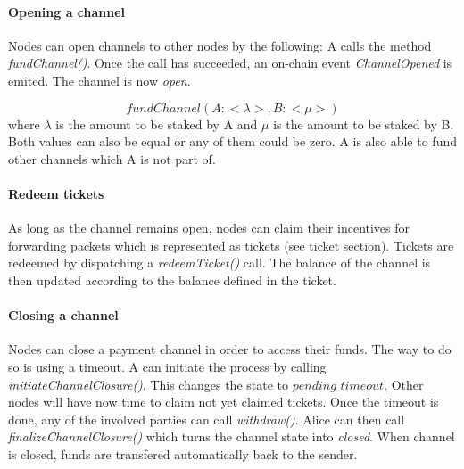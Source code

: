 \paragraph{Opening a channel} Nodes can open channels to other nodes by the following:
A calls the method \textit{fundChannel()}. Once the call has succeeded, an on-chain event \textit{ChannelOpened} is emited. The channel is now \textit{open}.


$$fundChannel(A: <\lambda>, B: <\mu>)$$ where $\lambda$ is the amount to be staked by A and $\mu$ is the amount to be staked by B. Both values can also be equal or any of them could be zero. A is also able to fund other channels which A is not part of.

\paragraph{Redeem tickets}
As long as the channel remains open, nodes can claim their incentives for forwarding packets which is represented as tickets (see ticket section). Tickets are redeemed by dispatching a \textit{redeemTicket()} call. The balance of the channel is then updated according to the balance defined in the ticket.
\paragraph{Closing a channel}
Nodes can close a payment channel in order to access their funds. The way to do so is using a timeout.
A can initiate the process by calling \textit{initiateChannelClosure()}. This changes the state to $pending\_timeout$. Other nodes will have now time to claim not yet claimed tickets. Once the timeout is done, any of the involved parties can call \textit{withdraw()}. Alice can then call \textit{finalizeChannelClosure()} which turns the channel state into \textit{closed}. When channel is closed, funds are transfered automatically back to the sender.

